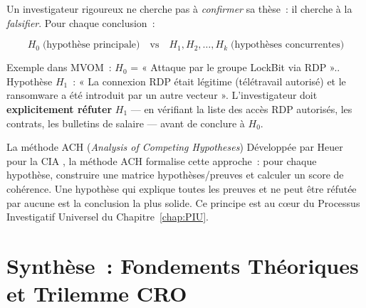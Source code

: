 Un investigateur rigoureux ne cherche pas à \emph{confirmer} sa thèse~:
il cherche à la \emph{falsifier}. Pour chaque conclusion~:

\begin{equation}
H_0 \;\text{(hypothèse principale)} \quad \text{vs} \quad
H_1, H_2, \ldots, H_k \;\text{(hypothèses concurrentes)}
\label{eq:hypotheses}
\end{equation}

Exemple dans MVOM~: $H_0$ = « Attaque par le groupe LockBit via RDP »..
Hypothèse $H_1$~: « La connexion RDP était légitime (télétravail autorisé)
et le ransomware a été introduit par un autre vecteur ». L'investigateur
doit \textbf{explicitement réfuter} $H_1$ --- en vérifiant la liste des
accès RDP autorisés, les contrats, les bulletins de salaire --- avant
de conclure à $H_0$.

\begin{boiteRemarque}{La méthode ACH (\textit{Analysis of Competing Hypotheses})}
Développée par Heuer pour la CIA \cite{heuer1999}, la méthode ACH formalise
cette approche~: pour chaque hypothèse, construire une matrice hypothèses/preuves
et calculer un score de cohérence. Une hypothèse qui explique toutes les preuves
et ne peut être réfutée par aucune est la conclusion la plus solide. Ce principe
est au cœur du Processus Investigatif Universel du
Chapitre~\ref{chap:PIU}.
\end{boiteRemarque}

\section{Synthèse~: Fondements Théoriques et Trilemme CRO}
\label{sec:fondements-cro}


